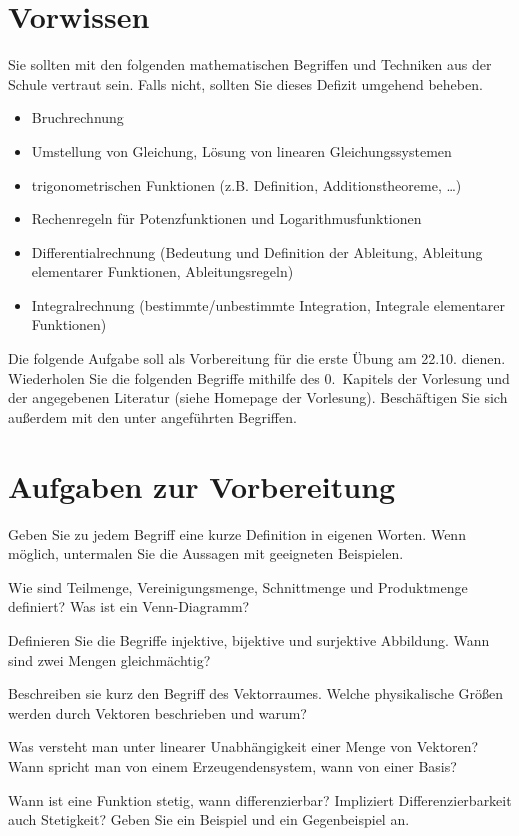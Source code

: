 \documentclass[11pt]{scrartcl}
\begin{document}
\section*{Vorwissen}
Sie sollten mit den folgenden mathematischen Begriffen und Techniken aus der Schule vertraut sein. Falls nicht, sollten Sie dieses Defizit umgehend beheben.
\begin{itemize}
  \item Bruchrechnung
  \item Umstellung von Gleichung, Lösung von linearen Gleichungssystemen
  \item trigonometrischen Funktionen (z.B. Definition, Additionstheoreme, \ldots)
  \item Rechenregeln für Potenzfunktionen und Logarithmusfunktionen
  \item Differentialrechnung (Bedeutung und Definition der Ableitung, Ableitung elementarer Funktionen, Ableitungsregeln)
  \item Integralrechnung (bestimmte/unbestimmte Integration, Integrale elementarer Funktionen)
\end{itemize}
\vspace{1em}

Die folgende Aufgabe soll als Vorbereitung für die erste Übung am 22.10. dienen.
Wiederholen Sie die folgenden Begriffe mithilfe des 0.\ Kapitels der Vorlesung und der angegebenen Literatur (siehe Homepage der Vorlesung).
Beschäftigen Sie sich außerdem mit den unter  angeführten Begriffen.

\section*{Aufgaben zur Vorbereitung}
Geben Sie zu jedem Begriff eine kurze Definition in eigenen Worten.
Wenn möglich, untermalen Sie die Aussagen mit geeigneten Beispielen.

\begin{description}[leftmargin=1cm,labelindent=1cm]
  \item[Mengen] Wie sind Teilmenge, Vereinigungsmenge, Schnittmenge und Produktmenge definiert?
  Was ist ein Venn-Diagramm?
  \item[Abbildungen] Definieren Sie die Begriffe injektive, bijektive und surjektive Abbildung.
  Wann sind zwei Mengen gleichmächtig?
  \item[Vektorraum] Beschreiben sie kurz den Begriff des Vektorraumes.
  Welche physikalische Größen werden durch Vektoren beschrieben und warum?
  \item[Lineare Unabhängigkeit] Was versteht man unter linearer Unabhängigkeit einer Menge von Vektoren?
  Wann spricht man von einem Erzeugendensystem, wann von einer Basis?
  \item[Stetigkeit und Differenzierbarkeit] Wann ist eine Funktion stetig, wann differenzierbar?
  Impliziert Differenzierbarkeit auch Stetigkeit?
  Geben Sie ein Beispiel und ein Gegenbeispiel an.
\end{description}
\end{document}

